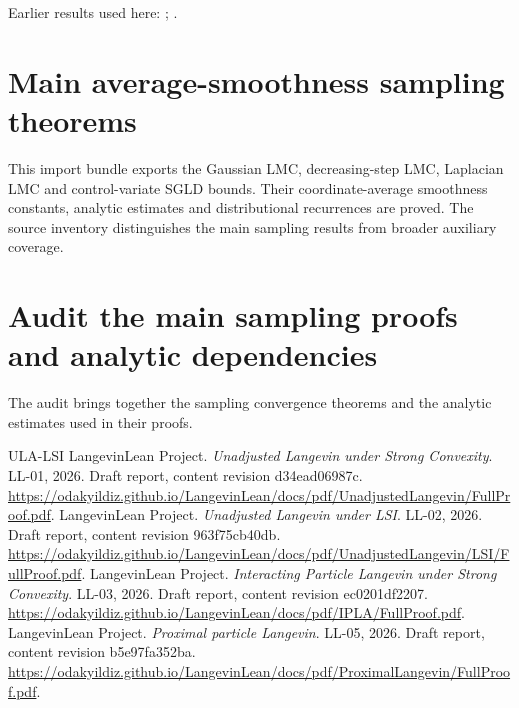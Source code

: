 \documentclass[11pt,a4paper]{report}
\begin{document}
Earlier results used here: \cite[Section~3.17.3]{LangevinLean2026ULASC}; \cite[Section~3.26.3]{LangevinLean2026ULASC}.
\section{\texorpdfstring{Main average-smoothness sampling theorems}{Main average-smoothness sampling theorems}}
\label{proof-module-AverageLMC-lean}


This import bundle exports the Gaussian LMC, decreasing-step LMC, Laplacian LMC and control-variate SGLD bounds. Their coordinate-average smoothness constants, analytic estimates and distributional recurrences are proved. The source inventory distinguishes the main sampling results from broader auxiliary coverage.

\section{\texorpdfstring{Audit the main sampling proofs and analytic dependencies}{Audit the main sampling proofs and analytic dependencies}}
\label{proof-module-AverageLMC-Check-lean}


The audit brings together the sampling convergence theorems and the analytic estimates used in their proofs.


\begin{thebibliography}{ULA-LSI}
LangevinLean Project. \emph{Unadjusted Langevin under Strong Convexity}. LL-01, 2026. Draft report, content revision d34ead06987c. \url{https://odakyildiz.github.io/LangevinLean/docs/pdf/UnadjustedLangevin/FullProof.pdf}.
LangevinLean Project. \emph{Unadjusted Langevin under LSI}. LL-02, 2026. Draft report, content revision 963f75cb40db. \url{https://odakyildiz.github.io/LangevinLean/docs/pdf/UnadjustedLangevin/LSI/FullProof.pdf}.
LangevinLean Project. \emph{Interacting Particle Langevin under Strong Convexity}. LL-03, 2026. Draft report, content revision ec0201df2207. \url{https://odakyildiz.github.io/LangevinLean/docs/pdf/IPLA/FullProof.pdf}.
LangevinLean Project. \emph{Proximal particle Langevin}. LL-05, 2026. Draft report, content revision b5e97fa352ba. \url{https://odakyildiz.github.io/LangevinLean/docs/pdf/ProximalLangevin/FullProof.pdf}.
\end{thebibliography}
\end{document}
